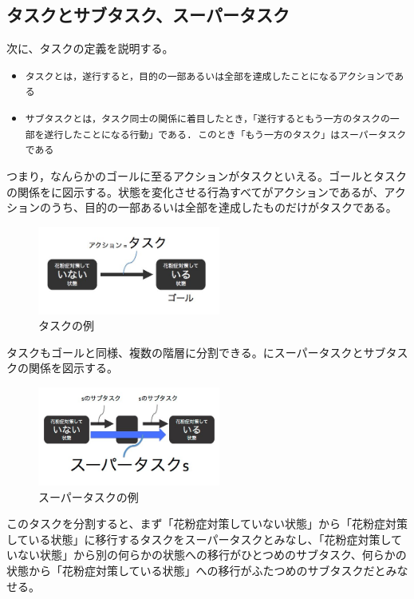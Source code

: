 \documentclass[submit,techreq]{ipsj}
\def\|{\verb|}
\begin{document}
%3.2
\subsection{タスクとサブタスク、スーパータスク}
\label{task_and_goal}


次に、タスクの定義を説明する。

\begin{itemize}

\item \|タスクとは，遂行すると，目的の一部あるいは全部を達成したことになるアクションである|
\item \|サブタスクとは，タスク同士の関係に着目したとき，「遂行するともう一方のタスクの一部を遂行したことになる行動」である. このとき「もう一方のタスク」はスーパータスクである|
\end{itemize}

つまり，なんらかのゴールに至るアクションがタスクといえる。ゴールとタスクの関係をに図示する。状態を変化させる行為すべてがアクションであるが、アクションのうち、目的の一部あるいは全部を達成したものだけがタスクである。


\begin{figure}[tb]
\includegraphics[width=6cm, bb=0 0 400 300]{action_task.jpg}
\caption{タスクの例}
\label{fig:action_task}
\end{figure}


タスクもゴールと同様、複数の階層に分割できる。にスーパータスクとサブタスクの関係を図示する。

\begin{figure}[tb]
\includegraphics[width=6cm, bb=0 0 400 300]{super_task.jpg}
\caption{スーパータスクの例}
\label{fig:super_task}
\end{figure}

このタスクを分割すると、まず「花粉症対策していない状態」から「花粉症対策している状態」に移行するタスクをスーパータスクとみなし、「花粉症対策していない状態」から別の何らかの状態への移行がひとつめのサブタスク、何らかの状態から「花粉症対策している状態」への移行がふたつめのサブタスクだとみなせる。
\end{document}
